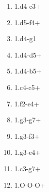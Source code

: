 \begin{enumerate}
\setcounter{enumi}{\value{d_counter}}
\item 1.\king{}d4-c3+
\item 1.\knight{}d5-f4+
\item 1.\bishop{}d4-g1
\item 1.\pawn{}d4-d5+
\item 1.\knight{}d4-b5+
\item 1.\pawn{}c4-c5+

\item 1.\knight{}f2-e4+
\item 1.\rook{}g3-g7+
\item 1.\rook{}g3-f3+
\item 1.\knight{}g3-e4+
\item 1.\queen{}c3-g7+
\item 1.O-O-O+
\setcounter{d_counter}{\value{enumi}}
\end{enumerate}